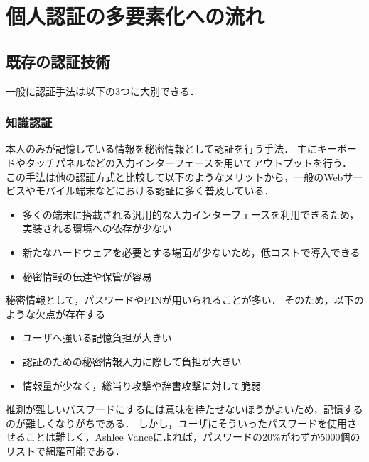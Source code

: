 \chapter{個人認証の多要素化への流れ}\label{chap:preparation}

\section{既存の認証技術}
一般に認証手法は以下の3つに大別できる．

\subsection{知識認証}
本人のみが記憶している情報を秘密情報として認証を行う手法．
主にキーボードやタッチパネルなどの入力インターフェースを用いてアウトプットを行う．
この手法は他の認証方式と比較して以下のようなメリットから，一般のWebサービスやモバイル端末などにおける認証に多く普及している．
\begin{itemize}
\item 多くの端末に搭載される汎用的な入力インターフェースを利用できるため，実装される環境への依存が少ない
\item 新たなハードウェアを必要とする場面が少ないため，低コストで導入できる
\item 秘密情報の伝達や保管が容易
\end{itemize}
秘密情報として，パスワードやPINが用いられることが多い．
そのため，以下のような欠点が存在する
\begin{itemize}
\item ユーザへ強いる記憶負担が大きい
\item 認証のための秘密情報入力に際して負担が大きい
\item 情報量が少なく，総当り攻撃や辞書攻撃に対して脆弱
\end{itemize}
推測が難しいパスワードにするには意味を持たせないほうがよいため，記憶するのが難しくなりがちである．
しかし，ユーザにそういったパスワードを使用させることは難しく，Ashlee Vance\cite{21password}によれば，パスワードの20\%がわずか5000個のリストで網羅可能である．

